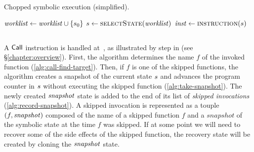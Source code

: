 \begin{algorithm}
\caption{Chopped symbolic execution (simplified).\label{fig:chopped-symbexe-recover}\label{fig:chopped-symbexe} }
\begin{algorithmic}[1]
  \State $\mathit{worklist} \gets \mathit{worklist} \cup \{ s_0\}$  \label{alg:seed-worklist}
  \While{$\worklist \neq \emptyset$}                     \label{alg:iterate-worklist}
    \State $\workstate \gets  \Call{selectState}{\worklist}$ \label{alg:pop-worklist}
    \State $\inst \gets  \Call{instruction}{\workstate}$ \label{alg:get-switch-inst}

    \Switch{$\inst$} \label{alg:switch}
     \label{alg:casecall-begin}
    \EndCase \label{alg:casecall-end}
     \label{alg:caseload-begin}
    \EndCase \label{alg:caseload-end}
     \label{alg:casebranch-begin}
    \EndCase \label{alg:casebranch-end}
     \label{alg:casestore-begin}
    \EndCase \label{alg:casestore-end}
     \label{alg:caseexit-begin}
    \EndCase \label{alg:caseexit-end}
    \EndSwitch
  \EndWhile
  \EndFunction
\end{algorithmic}
\end{algorithm}

\subsection{}
A $\mathsf{Call}$ instruction is handled at~,
as illustrated by step  in  (see \S\ref{chapter:overview}).
First, the algorithm determines the name $f$ of the invoked function
(\cref{alg:call-find-target}). Then, if $f$ is one of the skipped
functions, the algorithm creates a snapshot of the current state
$s$ and advances the program counter in $s$
without executing the skipped function (\cref{alg:take-snapshot}).
The newly created $\mathit{snapshot}$ state is added to the end of its list 
of \emph{skipped invocations} (\cref{alg:record-snapshot}).
A skipped invocation is represented as a touple $(f,\mathit{snapshot})$ composed of the name of a skipped
function $f$ and a $snapshot$ of the symbolic state at the time $f$ was skipped.
If at some point we will need to recover some of the side effects
of the skipped function, the recovery state will be created
by cloning the $\mathit{snapshot}$ state.

